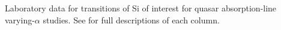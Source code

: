 Laboratory data for transitions of Si of interest for quasar absorption-line varying-$\alpha$ studies. See  for full descriptions of each column.
